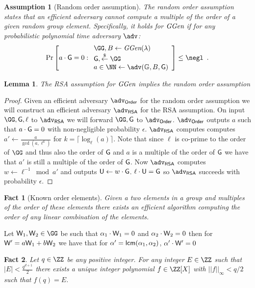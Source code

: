 \documentclass[11pt]{article}
\theoremstyle{Definition}
\newtheorem{lemma}{Lemma}
\newtheorem{assumption}{Assumption}
\newtheorem{fact}{Fact}
\begin{document}
\begin{assumption}[Random order assumption]
	The random order assumption states that an efficient adversary cannot compute a multiple of the order of a given random group element. Specifically, it holds for $\textit{GGen}$ if for any probabilistic polynomial time adversary $\adv$:
	\[
    \Pr\left[a\cdot \Generator =0:
    \begin{array}{l}
         \GG,B \leftarrow \ggen(\lambda)  \\
         \Generator, \sample \GG\\
         a \in \NN \leftarrow \adv(\mathbb{G},B, \Generator) \\
    \end{array}\right] \leq \negl \enspace .
    \]
\end{assumption}
\begin{lemma}
\label{lem:roa-to-rsa}
	The RSA assumption for $\textit{GGen}$ implies the random order assumption
	\end{lemma}
\begin{proof}
	Given an efficient adversary $\adv_{\textsf{Order}}$ for the random order assumption we will construct an efficient adversary $\adv_{\textsf{RSA}}$ for the RSA assumption. On input $\GG,\Generator,\ell$ to $\adv_{\textsf{RSA}}$ we will forward $\GG,\Generator$ to $\adv_{\textsf{Order}}$. $\adv_{\textsf{Order}}$ outputs $a$ such that $a\cdot \mathsf{G}=0$ with non-negligible probability $\epsilon$. 
	$\adv_{\textsf{RSA}}$ computes computes $a'\gets \frac{a}{\gcd(a,\ell^k)}$ for $k=\lceil\log_\ell(a)\rceil$. Note that since $\ell$ is co-prime to the order of $\GG$ and thus also the order of $\mathsf{G}$ and $a$ is a multiple of the order of $\mathsf{G}$ we have that $a'$ is still a multiple of the order of $\mathsf{G}$. Now $\adv_{\textsf{RSA}}$ computes $w\gets \ell^{-1} \bmod a'$ and outputs $\mathsf{U} \gets w\cdot \mathsf{G}$. $\ell \cdot \mathsf{U}=\mathsf{G}$ so $\adv_{\textsf{RSA}}$ succeeds with probability $\epsilon$.
\end{proof}
\begin{fact}[Known order elements]
	\label{fact:knownorder}
	Given a two elements in a group and multiples of the order of these elements there exists an efficient algorithm computing the order of any linear combination of the elements.
\end{fact}
Let $\gr{W}_1,\gr{W}_2 \in \GG$ be such that $\alpha_1 \cdot \mathsf{W}_1=0$ and $\alpha_2 \cdot \mathsf{W}_2=0$ then for $\mathsf{W}'=a\mathsf{W}_1 + b \mathsf{W}_2$ we have that for $\alpha'=\mathsf{lcm}(\alpha_1,\alpha_2)$, $\alpha' \cdot \mathsf{W}'=0$
\begin{fact}
\label{fact:encoding}
Let $q \in \ZZ$ be any positive integer. For any integer $E \in \ZZ$ such that $|E|<\frac{q^{d+1}}{2}$ there exists a unique integer polynomial $f \in \ZZ[X]$ with $||f||_\infty < q/2$ such that $f(q) = E$. 
\end{fact} 
\end{document}
